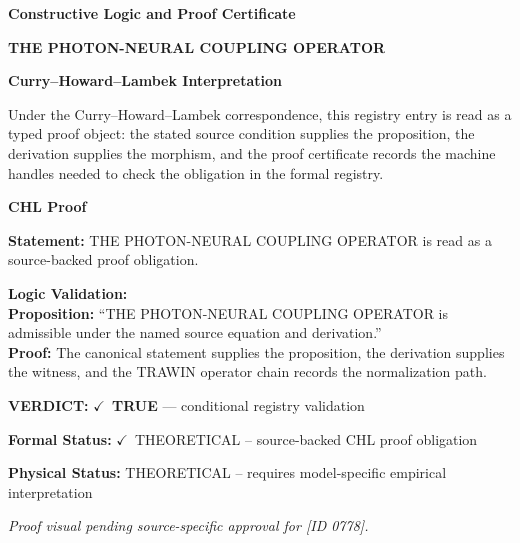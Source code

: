 \clearpage
\begingroup\tzpsupportsetup
\noindent\textbf{\fontsize{10.8pt}{12.8pt}\selectfont [ID 0778] Constructive Logic and Proof Certificate}\par
\noindent\textbf{\fontsize{10pt}{12pt}\selectfont THE PHOTON-NEURAL COUPLING OPERATOR}\par
\vspace{0.45em}
\begingroup
\footnotesize
\setlength{\parskip}{0.22em}
\setlength{\parindent}{0pt}
\noindent\textbf{Curry--Howard--Lambek Interpretation}\par
Under the Curry--Howard--Lambek correspondence, this registry entry is read as a typed proof
object: the stated source condition supplies the proposition, the derivation supplies the
morphism, and the proof certificate records the machine handles needed to check the obligation
in the formal registry.

\vspace{0.45em}
\noindent\textbf{CHL Proof}\par
\textbf{Statement:} THE PHOTON-NEURAL COUPLING OPERATOR is read as a source-backed proof obligation.

\textbf{Logic Validation:}\\
\textbf{Proposition:} ``THE PHOTON-NEURAL COUPLING OPERATOR is admissible under the named source equation and derivation.''\\
\textbf{Proof:} The canonical statement supplies the proposition, the derivation supplies the witness, and the TRAWIN operator chain records the normalization path.

\textbf{VERDICT:} \ensuremath{\checkmark}\ \textbf{TRUE} --- conditional registry validation

\textbf{Formal Status:} \ensuremath{\checkmark}\ THEORETICAL -- source-backed CHL proof obligation

\textbf{Physical Status:} THEORETICAL -- requires model-specific empirical interpretation
\par\vspace{0.45em}
\par
\vfill
\begingroup\footnotesize\itshape
Proof visual pending source-specific approval for [ID 0778].
\par\endgroup
\vfill
\endgroup
\endgroup
